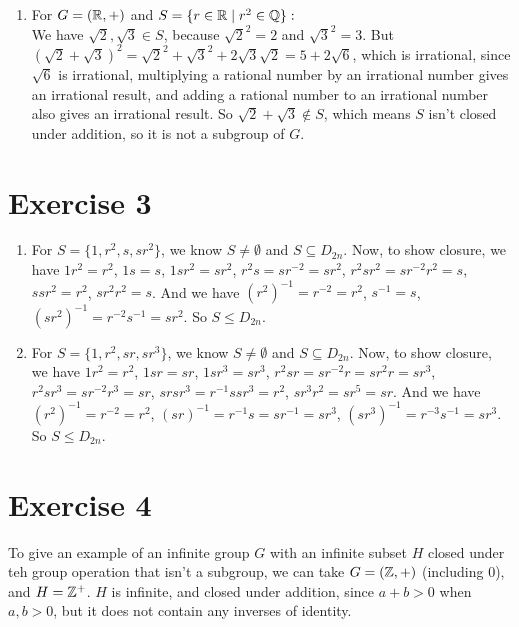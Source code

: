 \documentclass[12pt]{article}
\begin{document}
\begin{enumerate}[label=\textbf{\alph*.}]
        \item 
            For $G = (\mathbb{R}, +)$
            and $S = \{r \in \mathbb{R} \mid r^2 \in \mathbb{Q}\}:$ \\
            We have $\sqrt{2}, \sqrt{3} \in S$,
            because $\sqrt{2}^2 = 2$ and $\sqrt{3}^2 = 3$.
            But $(\sqrt{2} + \sqrt{3})^2
            = \sqrt{2}^2 + \sqrt{3}^2 + 2\sqrt{3}\sqrt{2}
            = 5 + 2\sqrt{6}$, which is irrational,
            since $\sqrt{6}$ is irrational,
            multiplying a rational number by an irrational number
            gives an irrational result,
            and adding a rational number to an irrational number also
            gives an irrational result.
            So $\sqrt{2} + \sqrt{3} \notin S$,
            which means $S$ isn't closed under addition,
            so it is not a subgroup of $G$.
    \end{enumerate}


    \section*{Exercise 3}
    \begin{enumerate}[label=\textbf{\alph*.}]
        \item 
            For $S = \{1, r^2, s, sr^2\}$,
            we know $S \neq \emptyset$ and $S \subseteq D_{2n}$.
            Now, to show closure, we have
            $1r^2 = r^2$, $1s = s$, $1sr^2 = sr^2$,
            $r^2s = sr^{-2} = sr^2$, $r^2sr^2 = sr^{-2}r^2 = s$,
            $ssr^2 = r^2$, $sr^2r^2 = s$.
            And we have $(r^2)^{-1} = r^{-2} = r^2$,
            $s^{-1} = s$, $(sr^2)^{-1} = r^{-2}s^{-1} = sr^2$.
            So $S \leqslant D_{2n}$.
        \item
            For $S = \{1, r^2, sr, sr^3\}$,
            we know $S \neq \emptyset$ and $S \subseteq D_{2n}$.
            Now, to show closure, we have
            $1r^2 = r^2$, $1sr = sr$, $1sr^3 = sr^3$,
            $r^2sr = sr^{-2}r = sr^2r = sr^3$, $r^2sr^3 = sr^{-2}r^3 = sr$,
            $srsr^3 = r^{-1}ssr^3 = r^2$, $sr^3r^2 = sr^5 = sr$.
            And we have $(r^2)^{-1} = r^{-2} = r^2$,
            $(sr)^{-1} = r^{-1}s = sr^{-1} = sr^3$,
            $(sr^3)^{-1} = r^{-3}s^{-1} = sr^3$.
            So $S \leqslant D_{2n}$.
    \end{enumerate}


    \section*{Exercise 4}
    To give an example of an infinite group $G$ with an infinite subset $H$
    closed under teh group operation that isn't a subgroup,
    we can take $G = (\mathbb{Z}, +)$ (including 0),
    and $H = \mathbb{Z}^+$. 
    $H$ is infinite, and closed under addition,
    since $a + b > 0$ when $a,b > 0$,
    but it does not contain any inverses of identity.
\end{document}
